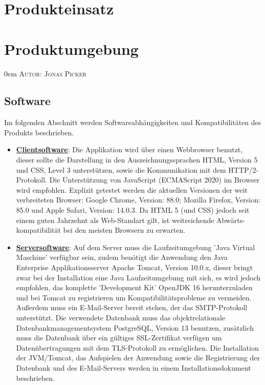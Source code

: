 \documentclass{article}
\makeatletter
\newcommand{\sectionauthor}[1]{
	{\parindent 0em \large \scshape Autor: #1 \par \nobreak \vspace*{2em}}
	\@afterheading
}
\makeatother
\begin{document}
\newpage

\section{Produkteinsatz} %

\newpage

\section{Produktumgebung} %
\sectionauthor{Jonas Picker}

\subsection{Software}

Im folgenden Abschnitt werden Softwareabhängigkeiten und Kompatibilitäten des Produkts beschrieben.

\begin{itemize}
\item \underline{\textbf{Clientsoftware}}: \linebreak
Die Applikation wird über einen Webbrowser benutzt, dieser sollte die Darstellung in den Auszeichnungssprachen HTML, Version 5 und CSS, Level 3 unterstützen, sowie die Kommunikation mit dem HTTP/2-Protokoll. Die Unterstützung von JavaScript (ECMAScript 2020) im Browser wird empfohlen. Explizit getestet werden die aktuellen Versionen der weit verbreiteten Browser: Google Chrome, Version: 88.0; Mozilla Firefox, Version: 85.0 und Apple Safari, Version: 14.0.3. Da HTML 5 (und CSS) jedoch seit einem guten Jahrzehnt als Web-Standart gilt, ist weitreichende Abwärts-kompatibilität bei den meisten Browsern zu erwarten.  

\item \underline{\textbf{Serversoftware}}: \linebreak
Auf dem Server muss die Laufzeitumgebung 'Java Virtual Maschine' verfügbar sein, zudem benötigt die Anwendung den Java Enterprise Applikationsserver Apache Tomcat, Version 10.0.x, dieser bringt zwar bei der Installation eine Java Laufzeitumgebung mit sich, es wird jedoch empfohlen, das komplette 'Development Kit' OpenJDK 16 herunterzuladen und bei Tomcat zu registrieren um Kompatibilitätsprobleme zu vermeiden. Außerdem muss ein E-Mail-Server bereit stehen, der das SMTP-Protokoll unterstützt. Die verwendete Datenbank muss das objektrelationale Datenbankmanagementsystem PostgreSQL, Version 13 benutzen, zusätzlich muss die Datenbank über ein gültiges SSL-Zertifikat verfügen um Datenübertragungen mit dem TLS-Protokoll zu ermöglichen. Die Installation der JVM/Tomcat, das Aufspielen der Anwendung sowie die Registrierung der Datenbank und des E-Mail-Servers werden in einem Installationsdokument beschrieben.
\end{itemize}
\end{document}
